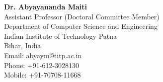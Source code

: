 \documentclass[mm]{simple_style}
\begin{document}
\begin{resume}
\textbf {Dr. Abyayananda Maiti}\\ 
Assistant Professor (Doctoral Committee Member)\\ 
Department of Computer Science and Engineering \\ 
Indian Institute of Technology Patna \\ Bihar, India\\
Email: abyaym@iitp.ac.in \\
Phone: +91-612-3028130 \\
Mobile: +91-70708-11668 \\
\sectionline

\end{resume}
\end{document}
